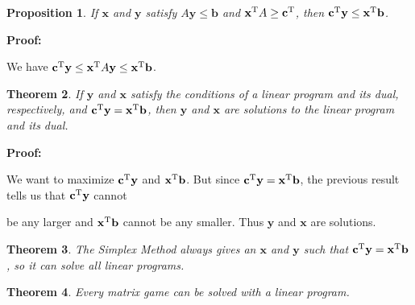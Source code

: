 \documentclass{article}
\theoremstyle{colontheorem}
\newtheorem{theorem}{Theorem}[section]
\newtheorem{proposition}[theorem]{Proposition}
\newcommand{\T}{^\textnormal{T}}
\newenvironment{Theorem}
{
	\begin{mdframed}[backgroundcolor=TheoremOrange!10]
	\begin{theorem}
}
{
	\end{theorem}
	\end{mdframed}
	
	\vspace{.15in}
}
\newenvironment{Proposition}
{
	\begin{mdframed}[backgroundcolor=TheoremOrange!10]
	\begin{proposition}
}
{
	\end{proposition}
	\end{mdframed}
	
	\vspace{.15in}
}
\newenvironment{Proof}
{
	\vspace{-.3in}
	
	\begin{mdframed}[backgroundcolor=ProofPurple!10]
	\textbf{Proof:}%
}
{
	\end{mdframed}
	
	\vspace{.15in}
}
\begin{document}
\begin{Proposition}
	
	If $\mathbf{x}$ and $\mathbf{y}$ satisfy $A\mathbf{y} \leq \mathbf{b}$ and $\mathbf{x}\T A \geq \mathbf{c}\T$, then $\mathbf{c}\T \mathbf{y} \leq \mathbf{x}\T \mathbf{b}$.
	
\end{Proposition}



\begin{Proof}
	We have $\mathbf{c}\T \mathbf{y} \leq \mathbf{x}\T A \mathbf{y} \leq \mathbf{x}\T \mathbf{b}$.
	
\end{Proof}



\begin{Theorem}
	
	If $\mathbf{y}$ and $\mathbf{x}$ satisfy the conditions of a linear program and its dual, respectively, and $\mathbf{c}\T \mathbf{y} = \mathbf{x}\T \mathbf{b}$, then $\mathbf{y}$ and $\mathbf{x}$ are solutions to the linear program and its dual.
	
\end{Theorem}



\begin{Proof}
	We want to maximize $\mathbf{c}\T \mathbf{y}$ and $\mathbf{x}\T \mathbf{b}$. But since $\mathbf{c}\T \mathbf{y} = \mathbf{x}\T \textbf{b}$, the previous result tells us that $\mathbf{c}\T \mathbf{y}$ cannot
	
	\pagebreak
	
	be any larger and $\mathbf{x}\T \mathbf{b}$ cannot be any smaller. Thus $\mathbf{y}$ and $\mathbf{x}$ are solutions.
	
\end{Proof}



\begin{Theorem}
	
	The Simplex Method always gives an $\mathbf{x}$ and $\mathbf{y}$ such that $\mathbf{c}\T \mathbf{y} = \mathbf{x}\T \textbf{b}$, so it can solve all linear programs.
	
\end{Theorem}



\begin{Theorem}
	
	Every matrix game can be solved with a linear program.
	
\end{Theorem}
\end{document}
